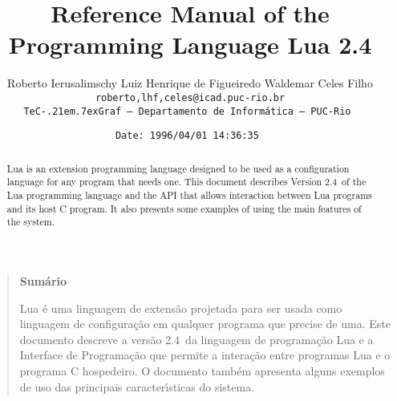 

\newcommand{\rw}[1]{{\bf #1}}
\newcommand{\see}[1]{see Section~\ref{#1}}
\newcommand{\nil}{{\bf nil}}
\newcommand{\Line}{\rule{\linewidth}{.5mm}}
\def\tecgraf{{\sf TeC\kern-.21em\lower.7ex\hbox{Graf}}}

\newcommand{\Index}[1]{#1\index{#1}}
\newcommand{\IndexVerb}[1]{{\tt #1}\index{#1}}
\newcommand{\Def}[1]{{\em #1}\index{#1}}
\newcommand{\Deffunc}[1]{\index{#1}}

\newcommand{\Version}{2.4}

\makeindex



\title{Reference Manual of the Programming Language Lua \Version}

\author{%
Roberto Ierusalimschy\quad
Luiz Henrique de Figueiredo\quad
Waldemar Celes Filho
\vspace{1.0ex}\\
\smallskip
\small\tt roberto,lhf,celes@icad.puc-rio.br
\vspace{2.0ex}\\
\tecgraf\ --- Departamento de Inform\'atica --- PUC-Rio
}

\date{\small \verb$Date: 1996/04/01 14:36:35 $}

\maketitle

\begin{abstract}
\noindent
Lua is an extension programming language designed to be used
as a configuration language for any program that needs one.
This document describes Version \Version\ of the Lua programming language and
the API that allows interaction between Lua programs and its host C program.
It also presents some examples of using the main features of the system.
\end{abstract}

\vspace{4ex}
\begin{quotation}
\small
\begin{center}{\bf Sum\'ario}\end{center}
\vspace{1ex}
\noindent
Lua \'e uma linguagem de extens\~ao projetada para ser usada como
linguagem de configura\c{c}\~ao em qualquer programa que precise de
uma.
Este documento descreve a vers\~ao \Version\ da linguagem de
programa\c{c}\~ao Lua e a Interface de Programa\c{c}\~ao que permite
a intera\c{c}\~ao entre programas Lua e o programa C hospedeiro.
O documento tamb\'em apresenta alguns exemplos de uso das principais
ca\-racte\-r\'{\i}sticas do sistema.
\end{quotation}


